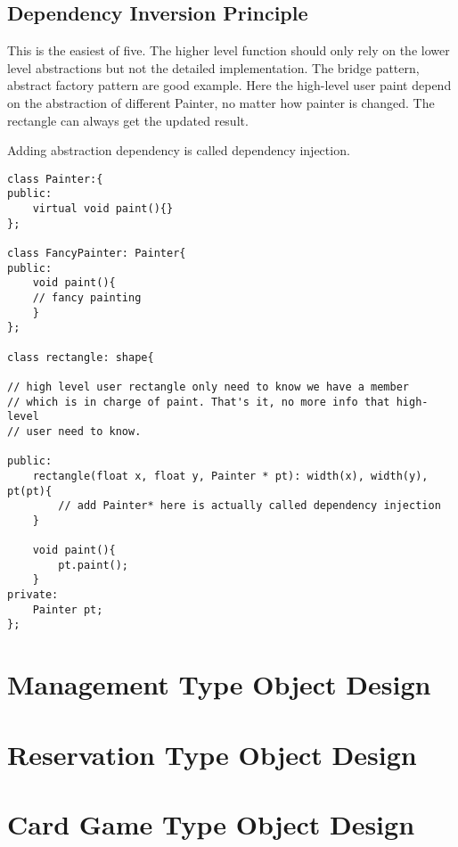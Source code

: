 \documentclass[11pt, oneside]{article}   	%
\begin{document}
\subsection{Dependency Inversion Principle}

This is the easiest of five. The higher level function should only rely on the lower level abstractions but not the detailed implementation.  
The bridge pattern, abstract factory pattern are good example. Here the high-level user paint depend on the abstraction of different Painter, 
no matter how painter is changed. The rectangle can always get the updated result.

Adding abstraction dependency is called dependency injection.

\begin{lstlisting}
class Painter:{
public:
	virtual void paint(){}
};

class FancyPainter: Painter{
public:
	void paint(){
	// fancy painting
	}
};

class rectangle: shape{

// high level user rectangle only need to know we have a member 
// which is in charge of paint. That's it, no more info that high-level 
// user need to know.

public:
	rectangle(float x, float y, Painter * pt): width(x), width(y), pt(pt){
		// add Painter* here is actually called dependency injection
	}
	
	void paint(){
		pt.paint();
	}
private:
	Painter pt;	
};

\end{lstlisting}

\newpage
\section{Management Type Object Design}
\section{Reservation Type Object Design}
\section{Card Game Type Object Design}
\end{document}
